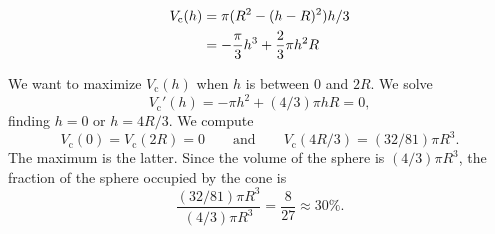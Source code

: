 \documentclass{ximera}
\begin{document}
\begin{example}
\begin{explanation}
\begin{align*}
 V_{\text{c}}(h)&=\pi(R^2-(h-R)^2)h/3 \\
&=-{\pi\over3}h^3+{2\over3}\pi h^2R
\end{align*}

We want to maximize $V_{\text{c}}(h)$ when $h$ is between $0$ and $2R$.  We
solve 
\[
V_{\text{c}}'(h)=-\pi h^2+(4/3)\pi h R=0,
\] 
finding $h=0$ or $h=4R/3$.  We compute
\[
V_{\text{c}}(0)=V_{\text{c}}(2R)=0\qquad\text{and}\qquad V_{\text{c}}(4R/3)=(32/81)\pi R^3.
\] 
The maximum is the latter. Since the volume of the sphere is $(4/3)\pi
R^3$, the fraction of the sphere occupied by the cone is
\[
\frac{(32/81)\pi R^3}{(4/3)\pi R^3}=\frac{8}{27}\approx 30\%.
\]
\end{explanation}
\end{example}
\end{document}
